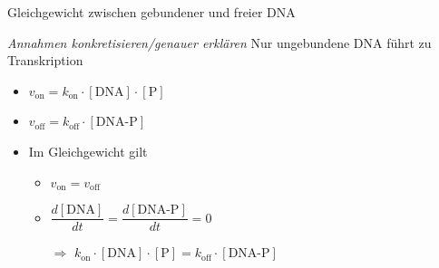 \documentclass[11pt,aspectratio=169,reqno]{beamer}
\begin{document}
\begin{frame}{Gleichgewicht zwischen gebundener und freier DNA}

    \emph{Annahmen konkretisieren/genauer erklären}
    Nur ungebundene DNA führt zu Transkription

    \begin{itemize}
        \item $v_\text{on}=k_\text{on}\cdot [\text{DNA}]\cdot [\text{P}]$
        \item $v_\text{off}=k_\text{off}\cdot [\text{DNA-P}]$\pause
        \item Im Gleichgewicht gilt 
        \begin{itemize}
            \item $v_\text{on}=v_\text{off}$\\[8pt]
            \item $\dfrac{d[\text{DNA}]}{dt}=\dfrac{d[\text{DNA-P}]}{dt}=0$\\[8pt]
            \item[$\Rightarrow$] $k_\text{on}\cdot [\text{DNA}]\cdot [\text{P}]=k_\text{off}\cdot [\text{DNA-P}]$
        \end{itemize}
    \end{itemize}
\end{frame}
\end{document}
